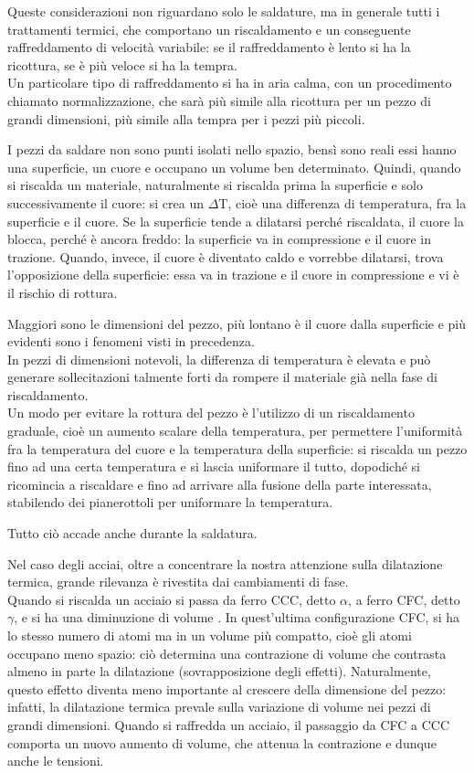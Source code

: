 Queste considerazioni non riguardano solo le saldature, ma in generale tutti i trattamenti termici, che comportano un riscaldamento e un conseguente raffreddamento di velocità variabile: se il raffreddamento è lento si ha la ricottura, se è più veloce si ha la tempra.\\
Un particolare tipo di raffreddamento si ha in aria calma, con un procedimento chiamato normalizzazione, che sarà più simile alla ricottura per un pezzo di grandi dimensioni, più simile alla tempra per i pezzi più piccoli.

I pezzi da saldare non sono punti isolati nello spazio, bensì sono reali essi hanno una superficie, un cuore e occupano un volume ben determinato. Quindi, quando si riscalda un materiale, naturalmente si riscalda prima la superficie e solo successivamente il cuore: si crea un $\Delta$T, cioè una differenza di temperatura, fra la superficie e il cuore. Se la superficie tende a dilatarsi perché riscaldata, il cuore la blocca, perché è ancora freddo: la superficie va in compressione e il cuore in trazione. Quando, invece, il cuore è diventato caldo e vorrebbe dilatarsi, trova l’opposizione della superficie: essa va in trazione e il cuore in compressione e vi è il rischio di rottura.

Maggiori sono le dimensioni del pezzo, più lontano è il cuore dalla superficie e più evidenti sono i fenomeni visti in precedenza. \\
In pezzi di dimensioni notevoli, la differenza di temperatura è elevata e può generare sollecitazioni talmente forti da rompere il materiale già nella fase di riscaldamento.\\
Un modo per evitare la rottura del pezzo è l’utilizzo di un riscaldamento graduale, cioè un aumento scalare della temperatura, per permettere l’uniformità fra la temperatura del cuore e la temperatura della superficie: si riscalda un pezzo fino ad una certa temperatura e si lascia uniformare il tutto, dopodiché si ricomincia a riscaldare e fino ad arrivare alla fusione della parte interessata, stabilendo dei pianerottoli per uniformare la temperatura.

Tutto ciò accade anche durante la saldatura.

Nel caso degli acciai, oltre a concentrare la nostra attenzione sulla dilatazione termica, grande rilevanza è rivestita dai cambiamenti di fase.\\
Quando si riscalda un acciaio si passa da ferro CCC, detto $\alpha$, a ferro CFC, detto $\gamma$, e si ha una diminuzione di volume . In quest’ultima configurazione CFC, si ha lo stesso numero di atomi ma in un volume più compatto, cioè gli atomi occupano meno spazio: ciò determina una contrazione di volume che contrasta almeno in parte la dilatazione (sovrapposizione degli effetti). Naturalmente, questo effetto diventa meno importante al crescere della dimensione del pezzo: infatti, la dilatazione termica prevale sulla variazione di volume nei pezzi di grandi dimensioni. Quando si raffredda un acciaio, il passaggio da CFC a CCC comporta un nuovo aumento di volume, che attenua la contrazione e dunque anche le tensioni.

